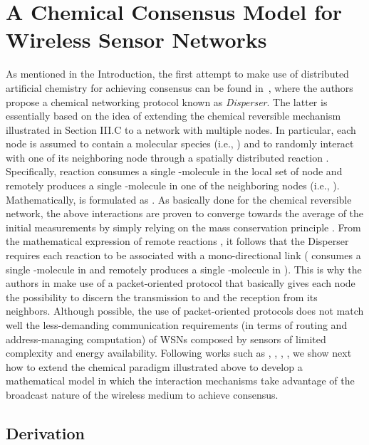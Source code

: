 \documentclass[journal]{IEEEtran}
\begin{document}
{\section{A Chemical Consensus Model for \newline Wireless Sensor Networks}\label{sec:WSN_CNP}
As mentioned in the Introduction, the first attempt to make use of distributed artificial chemistry for achieving consensus can be found in~\cite{MeTh}, where the authors propose a chemical networking protocol known as \emph{Disperser}. {The latter is essentially based on the idea of extending the chemical reversible mechanism illustrated in Section III.C to a network with multiple nodes. In particular, each node  is assumed to contain a molecular species  (i.e., ) and to randomly interact with one of its neighboring node  through a spatially distributed reaction . Specifically, reaction  consumes a single -molecule in the local set of node  and remotely produces a single -molecule in one of the neighboring nodes (i.e., ). Mathematically,  is formulated as .
As basically done for the chemical reversible network, the above interactions are proven to converge towards the average of the initial measurements by simply relying on the mass conservation principle \cite{MeTh}.} 
{From the mathematical expression of remote reactions , it follows that the Disperser} requires each reaction to be associated with a mono-directional link ( consumes a single -molecule in  and remotely produces a single -molecule in ). This is why the authors in \cite{MeTh} make use of a packet-oriented protocol that basically gives each node the possibility to discern the transmission to and the reception from its neighbors. {Although possible, the use of packet-oriented protocols does not match well the less-demanding communication requirements (in terms of routing and address-managing computation) of WSNs composed by sensors of limited complexity and energy availability.
Following works such as \cite{AyYi09}, \cite{FrGi11}, \cite{NoBa11}, \cite{NaDi11}, we
show next how {to extend the chemical paradigm illustrated above to develop a mathematical model in which the interaction mechanisms take advantage of the broadcast nature of the wireless medium to achieve consensus.}}}
\subsection{Derivation}
\end{document}
